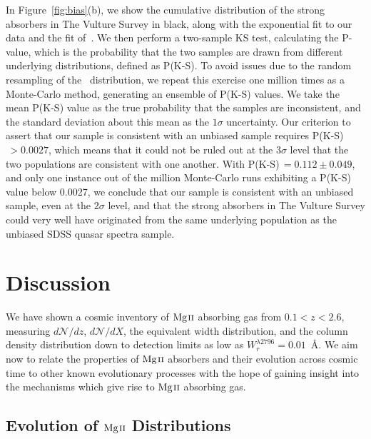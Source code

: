\documentclass[iop,apj,numberedappendix,appendixfloats,twocolappendix]{emulateapj}
\begin{document}
In Figure~\ref{fig:bias}(b), we show the cumulative distribution of the strong absorbers in The Vulture Survey in black, along with the exponential fit to our data and the fit of~\cite{Nestor2005}. We then perform a two-sample KS test, calculating the P-value, which is the probability that the two samples are drawn from different underlying distributions, defined as P(K-S). To avoid issues due to the random resampling of the~\cite{Nestor2005} distribution, we repeat this exercise one million times as a Monte-Carlo method, generating an ensemble of P(K-S) values. We take the mean P(K-S) value as the true probability that the samples are inconsistent, and the standard deviation about this mean as the $1\sigma$ uncertainty. Our criterion to assert that our sample is consistent with an unbiased sample requires P(K-S)$\, > 0.0027$, which means that it could not be ruled out at the $3\sigma$ level that the two populations are consistent with one another. With P(K-S)$\, = 0.112 \pm 0.049$, and only one instance out of the million Monte-Carlo runs exhibiting a P(K-S) value below 0.0027, we conclude that our sample is consistent with an unbiased sample, even at the $2\sigma$ level, and that the strong absorbers in The Vulture Survey could very well have originated from the same underlying population as the unbiased SDSS quasar spectra sample.


\section{Discussion}
\label{sec:discussion}

We have shown a cosmic inventory of ${\hbox{{\rm Mg}\kern 0.1em{\sc ii}}}$ absorbing gas from $0.1 < z < 2.6$, measuring $d\mathcal{N}\!/dz$, $d\mathcal{N}\!/dX$, the equivalent width distribution, and the column density distribution down to detection limits as low as $W_r^{\lambda2796} = 0.01$~{\AA}. We aim now to relate the properties of ${\hbox{{\rm Mg}\kern 0.1em{\sc ii}}}$ absorbers and their evolution across cosmic time to other known evolutionary processes with the hope of gaining insight into the mechanisms which give rise to ${\hbox{{\rm Mg}\kern 0.1em{\sc ii}}}$ absorbing gas.

\subsection{Evolution of ${\hbox{{\rm Mg}\kern 0.1em{\sc ii}}}$ Distributions}
\end{document}
